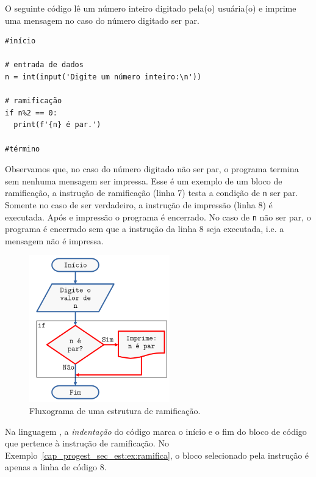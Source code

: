 \begin{ex}\label{cap_progest_sec_est:ex:ramifica}
  O seguinte código lê um número inteiro digitado pela(o) usuária(o) e imprime uma mensagem no caso do número digitado ser par.

\begin{lstlisting}
#início

# entrada de dados
n = int(input('Digite um número inteiro:\n'))

# ramificação
if n%2 == 0:
  print(f'{n} é par.')

#término
\end{lstlisting}

Observamos que, no caso do número digitado não ser par, o programa termina sem nenhuma mensagem ser impressa. Esse é um exemplo de um bloco de ramificação, a instrução de ramificação (linha 7) testa a condição de \lstinline+n+ ser par. Somente no caso de ser verdadeiro, a instrução de impressão (linha 8) é executada. Após e impressão o programa é encerrado. No caso de \lstinline+n+ não ser par, o programa é encerrado sem que a instrução da linha 8 seja executada, i.e. a mensagem não é impressa.

\begin{figure}[H]
  \centering
  \includegraphics[width=2.4in]{./cap_progest/dados/fig_fg_ramifica/fig.png}
  \caption{Fluxograma de uma estrutura de ramificação.}
  \label{cap_progest:fig:fg_ramifica}
\end{figure}
  
\end{ex}

\begin{obs}[\hl{Indentação}]
  Na linguagem {\python}, a \emph{indentação} do código marca o início e o fim do bloco de código que pertence à instrução de ramificação. No Exemplo~\ref{cap_progest_sec_est:ex:ramifica}, o bloco selecionado pela instrução {\PYTHONif} é apenas a linha de código 8.
\end{obs}

